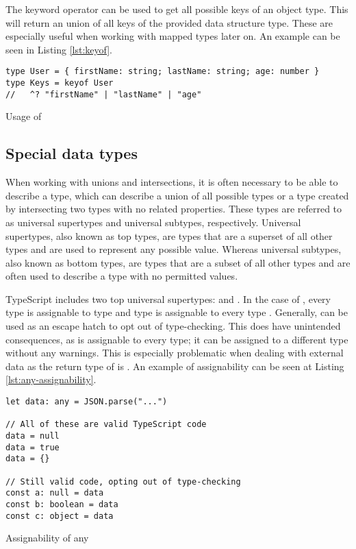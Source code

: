 The  keyword operator can be used to get all possible keys of an object type. This will return an union of all keys of the provided data structure type. These are especially useful when working with mapped types later on. An example can be seen in Listing \ref{lst:keyof}.

\begin{listing}[ht]
  \begin{verbatim}
type User = { firstName: string; lastName: string; age: number }
type Keys = keyof User
//   ^? "firstName" | "lastName" | "age"
\end{verbatim}
  \caption{Usage of }\label{lst:keyof}
\end{listing}

\subsection{Special data types}

When working with unions and intersections, it is often necessary to be able to describe a type, which can describe a union of all possible types or a type created by intersecting two types with no related properties. These types are referred to as universal supertypes and universal subtypes, respectively. Universal supertypes, also known as top types, are types that are a superset of all other types and are used to represent any possible value. Whereas universal subtypes, also known as bottom types, are types that are a subset of all other types and are often used to describe a type with no permitted values.

TypeScript includes two top universal supertypes:  and . In the case of , every type is assignable to type  and type  is assignable to every type \cite{TopTypesAny}. Generally,  can be used as an escape hatch to opt out of type-checking. This does have unintended consequences, as  is assignable to every type; it can be assigned to a different type without any warnings. This is especially problematic when dealing with external data as the return type of  is . An example of assignability can be seen at Listing \ref{lst:any-assignability}.

\begin{listing}[ht]
  \begin{verbatim}
let data: any = JSON.parse("...") 

// All of these are valid TypeScript code
data = null
data = true
data = {}

// Still valid code, opting out of type-checking
const a: null = data
const b: boolean = data
const c: object = data
  \end{verbatim}
  \caption{Assignability of any}\label{lst:any-assignability}
\end{listing}

